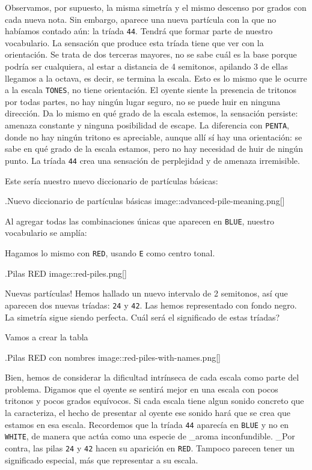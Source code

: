 \documentclass[]{article}
\begin{document}
Observamos, por supuesto, la misma simetría y el mismo descenso por grados con cada nueva nota. Sin embargo, aparece una nueva partícula con la que no habíamos contado aún: la tríada \texttt{44}. Tendrá que formar parte de nuestro vocabulario. La sensación que produce esta tríada tiene que ver con la orientación. Se trata de dos terceras mayores, no se sabe cuál es la base porque podría ser cualquiera, al estar a distancia de 4 semitonos, apilando 3 de ellas llegamos a la octava, es decir, se termina la escala. Esto es lo mismo que le ocurre a la escala \texttt{TONES}, no tiene orientación. El oyente siente la presencia de tritonos por todas partes, no hay ningún lugar seguro, no se puede huir en ninguna dirección. Da lo mismo en qué grado de la escala estemos, la sensación persiste: amenaza constante y ninguna posibilidad de escape. La diferencia con \texttt{PENTA}, donde no hay ningún tritono es apreciable, aunque allí sí hay una orientación: se sabe en qué grado de la escala estamos, pero no hay necesidad de huir de ningún punto. La tríada \texttt{44} crea una sensación de perplejidad y de amenaza irremisible.

Este sería nuestro nuevo diccionario de partículas básicas:

.Nuevo diccionario de partículas básicas image::advanced-pile-meaning.png{[}{]}

Al agregar todas las combinaciones únicas que aparecen en \texttt{BLUE}, nuestro vocabulario se amplía:

Hagamos lo mismo con \texttt{RED}, usando \texttt{E} como centro tonal.

.Pilas RED image::red-piles.png{[}{]}

Nuevas partículas! Hemos hallado un nuevo intervalo de 2 semitonos, así que aparecen dos nuevas tríadas: \texttt{24} y \texttt{42}. Las hemos representado con fondo negro. La simetría sigue siendo perfecta. Cuál será el significado de estas tríadas?

Vamos a crear la tabla

.Pilas RED con nombres image::red-piles-with-names.png{[}{]}

Bien, hemos de considerar la dificultad intrínseca de cada escala como parte del problema. Digamos que el oyente se sentirá mejor en una escala con pocos tritonos y pocos grados equívocos. Si cada escala tiene algun sonido concreto que la caracteriza, el hecho de presentar al oyente ese sonido hará que se crea que estamos en esa escala. Recordemos que la tríada \texttt{44} aparecía en \texttt{BLUE} y no en \texttt{WHITE}, de manera que actúa como una especie de \_aroma inconfundible. \_Por contra, las pilas \texttt{24} y \texttt{42} hacen su aparición en \texttt{RED}. Tampoco parecen tener un significado especial, más que representar a su escala.
\end{document}
